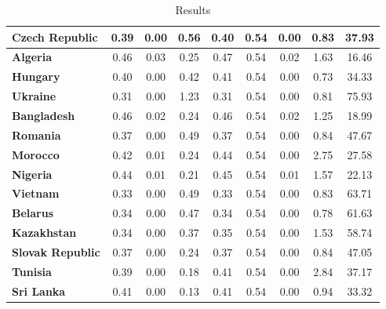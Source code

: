 \documentclass{article}
\begin{document}
\begin{center}
\begin{table}
\begin{small}
\begin{tabular}{|l|c|c|c|c|c|c|c|c|}
\textbf{Czech Republic}&0.39&0.00&0.56&0.40&0.54&0.00&0.83&37.93\\\hline
\textbf{Algeria}&0.46&0.03&0.25&0.47&0.54&0.02&1.63&16.46\\\hline
\textbf{Hungary}&0.40&0.00&0.42&0.41&0.54&0.00&0.73&34.33\\\hline
\textbf{Ukraine}&0.31&0.00&1.23&0.31&0.54&0.00&0.81&75.93\\\hline
\textbf{Bangladesh}&0.46&0.02&0.24&0.46&0.54&0.02&1.25&18.99\\\hline
\textbf{Romania}&0.37&0.00&0.49&0.37&0.54&0.00&0.84&47.67\\\hline
\textbf{Morocco}&0.42&0.01&0.24&0.44&0.54&0.00&2.75&27.58\\\hline
\textbf{Nigeria}&0.44&0.01&0.21&0.45&0.54&0.01&1.57&22.13\\\hline
\textbf{Vietnam}&0.33&0.00&0.49&0.33&0.54&0.00&0.83&63.71\\\hline
\textbf{Belarus}&0.34&0.00&0.47&0.34&0.54&0.00&0.78&61.63\\\hline
\textbf{Kazakhstan}&0.34&0.00&0.37&0.35&0.54&0.00&1.53&58.74\\\hline
\textbf{Slovak Republic}&0.37&0.00&0.24&0.37&0.54&0.00&0.84&47.05\\\hline
\textbf{Tunisia}&0.39&0.00&0.18&0.41&0.54&0.00&2.84&37.17\\\hline
\textbf{Sri Lanka}&0.41&0.00&0.13&0.41&0.54&0.00&0.94&33.32\\\hline
\end{tabular}
\end{small}
\caption{Results}
\label{results}
\end{table}
\end{center}
\end{document}
